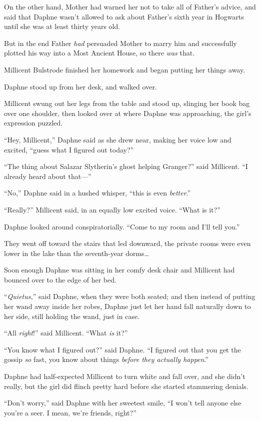 On the other hand, Mother had warned her not to take all of Father’s advice, and said that Daphne wasn’t allowed to ask about Father’s sixth year in Hogwarts until she was at least thirty years old.

But in the end Father \emph{had} persuaded Mother to marry him and successfully plotted his way into a Most Ancient House, so there \emph{was} that.

Millicent Bulstrode finished her homework and began putting her things away.

Daphne stood up from her desk, and walked over.

Millicent swung out her legs from the table and stood up, slinging her book bag over one shoulder, then looked over at where Daphne was approaching, the girl’s expression puzzled.

“Hey, Millicent,” Daphne said as she drew near, making her voice low and excited, “guess what I figured out today?”

“The thing about Salazar Slytherin’s ghost helping Granger?” said Millicent. “I already heard about that—”

“No,” Daphne said in a hushed whisper, “this is even \emph{better}.”

“Really?” Millicent said, in an equally low excited voice. “What is it?”

Daphne looked around conspiratorially. “Come to my room and I’ll tell you.”

They went off toward the stairs that led downward, the private rooms were even lower in the lake than the seventh-year dorms…

Soon enough Daphne was sitting in her comfy desk chair and Millicent had bounced over to the edge of her bed.

“\emph{Quietus,}” said Daphne, when they were both seated; and then instead of putting her wand away inside her robes, Daphne just let her hand fall naturally down to her side, still holding the wand, just in case.

“All \emph{right}!” said Millicent. “What \emph{is} it?”

“You know what I figured out?” said Daphne. “I figured out that you get the gossip \emph{so} fast, you know about things \emph{before they actually happen}.”

Daphne had half-expected Millicent to turn white and fall over, and she didn’t really, but the girl did flinch pretty hard before she started stammering denials.

“Don’t worry,” said Daphne with her sweetest smile, “I won’t tell anyone else you’re a seer. I mean, we’re friends, right?”


